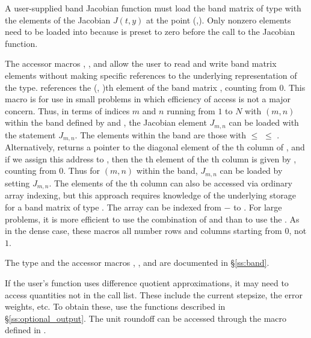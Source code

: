 {
  A user-supplied band Jacobian function must load the band matrix 
  of type  with the elements of the Jacobian $J(t,y)$ at the
  point (,).  Only nonzero elements need to be loaded into
   because  is preset to zero before the call to the
  Jacobian function.  

  The accessor macros , , and  
  allow the user to read and write band matrix elements without making specific 
  references to the underlying representation of the  type.
   references the (, )th element of the 
  band matrix , counting from $0$.
  This macro is for use in small problems in which efficiency of access is not
  a major concern.  Thus, in terms of indices $m$ and $n$ running from $1$ to
  $N$ with $(m,n)$ within the band defined by  and
  , the Jacobian element $J_{m,n}$ can be loaded with the 
  statement  $J_{m,n}$. The elements within
  the band are those with  $\le$  $\le$ .
  Alternatively,  returns a pointer to the diagonal element of the
  th column of , and if we assign this address to 
  , then the th element of the th column is
  given by , counting from $0$.
  Thus for $(m,n)$ within the band, $J_{m,n}$ can be loaded by setting 
    $J_{m,n}$.
  The elements of the th column can also be accessed
  via ordinary array indexing, but this approach requires knowledge of
  the underlying storage for a band matrix of type .  
  The array  can be indexed from $-$ to .
  For large problems, it is more efficient to use the combination of
   and  than to use the
  .  As in the dense case, these macros all number rows
  and columns starting from $0$, not $1$.  

  The  type and the accessor macros , , and
   are documented in \S\ref{ss:band}.

  If the user's  function uses difference quotient approximations,
  it may need to access quantities not in the call list. These include the current
  stepsize, the error weights, etc. To obtain these, use the  functions 
  described in \S\ref{ss:optional_output}. The unit roundoff can be accessed through
  the macro  defined in .
}
